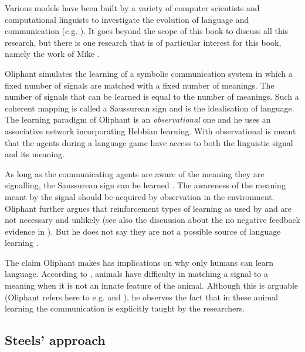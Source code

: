 
Various models have been built by a variety of computer scientists and computational linguists to investigate the evolution of language and communication (e.g. \citealt{cangelosiparisi:1998,kirby:1997,maclennan:1991,oliphant:1997,wernerdyer:1991}). It goes beyond the scope of this book to discuss all this research, but there is one research that is of particular interest for this book, namely the work of Mike \citet{oliphant:1997,oliphant:1998,oliphant:2000}.

Oliphant simulates the learning of a symbolic communication system in which a fixed number of signals are matched with a fixed number of meanings. The number of signals that can be learned is equal to the number of meanings. Such a coherent mapping is called a Saussurean sign \citep{saussure:1974} and is the idealisation of language. The learning paradigm of Oliphant is an {\em observational} one and he uses an associative network incorporating Hebbian learning. With observational is meant that the agents during a language game have access to both the linguistic signal and its meaning.

As long as the communicating agents are aware of the meaning they are signalling, the Saussurean sign can be learned \citep{oliphant:1997,oliphant:2000}. The awareness of the meaning meant by the signal should be acquired by observation in the environment. Oliphant further argues that reinforcement types of learning as used by \citet{yancostein} and \citet{steels:1996a} are not necessary and unlikely (see also the discussion about the no negative feedback evidence in ). But he does not say they are not a possible source of language learning \citep{oliphant:2000}.

The claim Oliphant makes has implications on why only humans can learn language. According to \citet{oliphant:1998}, animals have difficulty in matching a signal to a meaning when it is not an innate feature of the animal. Although this is arguable (Oliphant refers here to e.g. \citealt{gardners:1969} and \citealt{premack:1971}), he observes the fact that in these animal learning the communication is explicitly taught by the researchers.


\subsection{Steels' approach}\label{s:intro:th}

